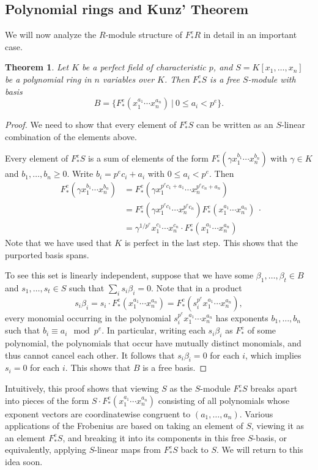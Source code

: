 \documentclass[12pt]{amsart}
\newtheorem{theorem}{Theorem}[section]
\theoremstyle{definition}
\numberwithin{equation}{theorem}
\begin{document}
\subsection*{Polynomial rings and Kunz' Theorem} We will now analyze the $R$-module structure of $F^e_*R$ in detail in an important case. 
\begin{theorem}\label{thm:perfectgens} Let $K$ be a perfect field of characteristic $p$, and $S=K[x_1,\dots,x_n]$ be a polynomial ring in $n$ variables over $K$. Then $F^e_*S$ is a free $S$-module with basis
\[ B= \{ F^e_*(x_1^{a_1} \cdots x_n^{a_n}) \ | \ 0\leq a_i < p^e \}.\]
\end{theorem}
\begin{proof}
We need to show that every element of $F^e_* S$ can be written as an $S$-linear combination of the elements above. 

Every element of $F^e_* S$ is a sum of elements of the form $F^e_*( \gamma x_1^{b_1} \cdots x_n^{b_n})$ with $\gamma \in K$ and $b_1,\dots,b_n \geq 0$. Write $b_i = p^e c_i + a_i$ with $0\leq a_i < p^e$. Then 
\[ \begin{aligned} F^e_*( \gamma x_1^{b_1} \cdots x_n^{b_n}) &= F^e_*( \gamma x_1^{p^e c_1 + a_1} \cdots x_n^{p^e c_n + a_n}) \\
&= F^e_*( \gamma x_1^{p^e c_1} \cdots x_n^{p^e c_n}) F^e_*(x_1^{a_1} \cdots x_n^{a_n}) \\
&= \gamma^{1/p^e} x_1^{c_1} \cdots x_n^{c_n} \cdot F^e_*(x_1^{a_1} \cdots x_n^{a_n})\end{aligned}.\]
Note that we have used that $K$ is perfect in the last step. This shows that the purported basis spans. 

To see this set is linearly independent, suppose that we have some $\beta_1,\dots,\beta_t\in B$ and ${s_1,\dots,s_t\in S}$ such that $\sum_i s_i \beta_i = 0$. Note that in a product
\[ s_i \beta_i = s_i \cdot F^e_*(x_1^{a_1} \cdots x_n^{a_n}) = F^e_*(s_i^{p^e} x_1^{a_1} \cdots x_n^{a_n}),\]
every monomial occurring in the polynomial $s_i^{p^e} x_1^{a_1} \cdots x_n^{a_n}$ has exponents $b_1,\dots,b_n$ such that $b_i \equiv a_i \mod p^e$. In particular, writing each $s_i \beta_i$ as $F^e_*$ of some polynomial, the polynomials that occur have mutually distinct monomials, and thus cannot cancel each other. It follows that $s_i \beta_i=0$ for each $i$, which implies $s_i=0$ for each $i$. This shows that $B$ is a free basis.
\end{proof}

Intuitively, this proof shows that viewing $S$ as the $S$-module $F^e_*S$ breaks apart into pieces of the form $S\cdot  F^e_*(x_1^{a_1} \cdots x_n^{a_n})$ consisting of all polynomials whose exponent vectors are coordinatewise congruent to $(a_1,\dots,a_n)$. Various applications of the Frobenius are based on taking an element of $S$, viewing it as an element $F^e_*S$, and breaking it into its components in this free $S$-basis, or equivalently, applying $S$-linear maps from $F^e_*S$ back to $S$. We will return to this idea soon.
\end{document}
